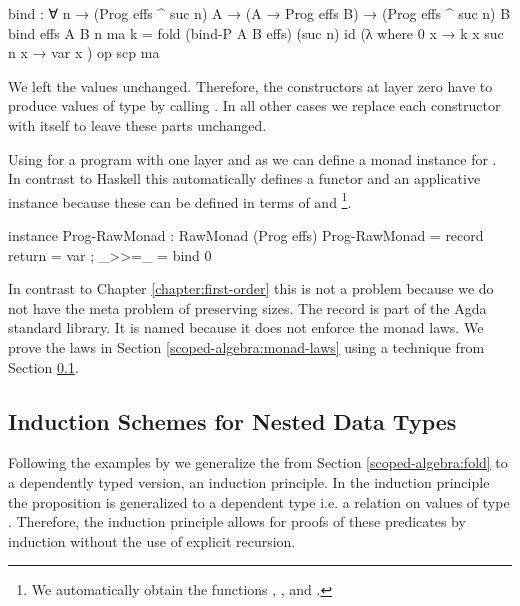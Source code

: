\begin{code}
bind : ∀ n → (Prog effs ^ suc n) A → (A → Prog effs B) →
  (Prog effs ^ suc n) B
bind {effs} {A} {B} n ma k = fold (bind-P A B effs) (suc n) id (λ where
    {0}      x → k x
    {suc n}  x → var x
  ) op scp ma
\end{code}
We left the values unchanged.
Therefore, the  constructors at layer zero have to
produce values of type
\AgdaSpace{}\AgdaSpace{}
by calling .
In all other cases we replace each constructor with itself to leave these parts
unchanged.

Using \AgdaFunction{>>=} for a program with one layer and
 as  we can define a monad
instance for \AgdaSpace{}.
In contrast to Haskell this automatically defines a functor and an applicative
instance because these can be defined in terms of \AgdaFunction{>>=} and
\footnote{We automatically obtain the functions
  \AgdaFunction{<\$>}, \AgdaFunction{<*>},  and
  \AgdaFunction{>>}. }.
\begin{code}
instance
  Prog-RawMonad : RawMonad (Prog effs)
  Prog-RawMonad = record { return = var ; _>>=_ = bind 0 }
\end{code}
In contrast to Chapter \ref{chapter:first-order} this is not a problem because
we do not have the meta problem of preserving sizes.
The record is part of the Agda standard library.
It is named  because it does not enforce the monad laws.
We prove the laws in Section \ref{scoped-algebra:monad-laws} using
a technique from Section \ref{scoped-algebra:ind}.


\subsection{Induction Schemes for Nested Data Types}
\label{scoped-algebra:ind}

Following the examples by \textcite{DBLP:journals/corr/abs-1806-05230} we
generalize the  from Section \ref{scoped-algebra:fold} to a
dependently typed version, an induction principle.
In the induction principle the proposition  is generalized to a
dependent type i.e. a relation on values of type 
\AgdaSpace{}\AgdaSpace{}.
Therefore, the induction principle allows for proofs of these predicates by
induction without the use of explicit recursion.

